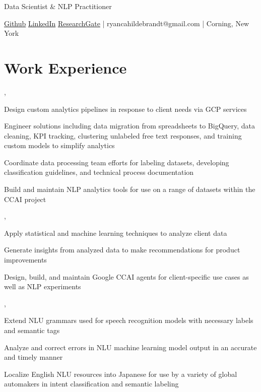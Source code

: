 \documentclass[letterpaper]{deedy-resume_sm}
\begin{document}
\lastupdated %

\leavevmode

\sectionspace
\leavevmode
Data Scientist \& NLP Practitioner
\leavevmode

\href{https://github.com/ryancahildebrandt}{Github}
\href{https://linkedin.com/in/rcah}{LinkedIn}
\href{https://researchgate.net/profile/Ryan-Hildebrandt}{ResearchGate}
 | ryancahildebrandt@gmail.com | Corning, New York

\sectionspace

\section{Work Experience}
, 
\begin{tightitemize}
\item Design custom analytics pipelines in response to client needs via GCP services
\item Engineer solutions including data migration from spreadsheets to BigQuery, data cleaning, KPI tracking, clustering unlabeled free text responses, and training custom models to simplify analytics
\item Coordinate data processing team efforts for labeling datasets, developing classification guidelines, and technical process documentation
\item Build and maintain NLP analytics tools for use on a range of datasets within the CCAI project
\end{tightitemize}
\sectionspace

, 
\begin{tightitemize}
\item Apply statistical and machine learning techniques to analyze client data
\item Generate insights from analyzed data to make recommendations for product improvements
\item Design, build, and maintain Google CCAI agents for client-specific use cases as well as NLP experiments
\end{tightitemize}
\sectionspace

, 
\begin{tightitemize}
\item Extend NLU grammars used for speech recognition models with necessary labels and semantic tags
\item Analyze and correct errors in NLU machine learning model output in an accurate and timely manner
\item Localize English NLU resources into Japanese for use by a variety of global automakers in intent classification and semantic labeling
\end{tightitemize}
\sectionspace
\end{document}
